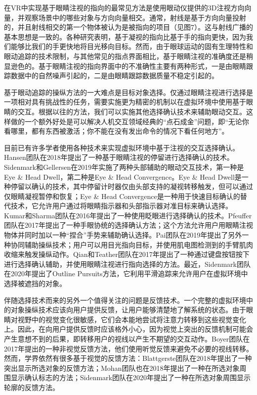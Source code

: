 在VR中实现基于眼睛注视的指向的最常见方法是使用眼动仪提供的3D注视方向向量，并观察场景中的哪些对象与方向向量相交。通常，射线是基于方向向量投射的，并且射线相交的第一个物体被认为是被指向的项目（见图7）。这与射线广播的基本思想是一致的。各种研究表明，基于凝视的指向比基于手的指向更快，因为我们能够比我们的手更快地将目光移向目标。然而，由于眼球运动的固有生理特性和眼动追踪的技术限制，与其他常见的指点界面相比，基于眼睛注视的准确度还是稍显逊色的。基于眼睛注视的指向界面中的不准确性主要有两种形式，一是由眼睛跟踪数据中的自然噪声引起的，二是由眼睛跟踪数据质量不稳定引起的。

基于眼动追踪的操纵方法的一大难点是目标对象选择。仅通过眼睛注视进行选择是一项相对具有挑战性的任务，需要实施更为精密的机制以在虚拟环境中使用基于眼睛的交互。根据以往的方法，我们可以实施其他选择确认技术来辅助眼动交互。这样做的一个额外好处是可以解决人机交互领域经典的“点石成金”问题，即“无论你看哪里，都有东西被激活；你不能在没有发出命令的情况下看任何地方”。

目前已有许多学者使用各种技术来实现虚拟环境中基于注视的交互选择确认。Hansen团队在2018年提出了一种基于眼睛注视的停留进行选择确认的技术。Sidenmark和Gellersen在2019年实施了两种头部辅助的眼动交互技术，第一种是Eye \& Head Dwell，第二种是Eye \& Head Convergence。Eye \& Head Dwell是一种停留以确认的技术，其中停留计时器仅由头部支持的凝视转移触发，但可以通过仅眼睛凝视暂停和恢复；Eye \& Head Convergence是一种用于快速目标确认的替代技术，它允许用户通过将眼睛指示器和头部指示器对准目标来确认选择。Kumar和Sharma团队在2016年提出了一种使用眨眼进行选择确认的技术。Pfeuffer团队在2017年提出了一种手眼协统的选择确认方法；这个方法允许用户用眼睛注视物体并同时加以一种“捏合”手势来辅助确认选择。Pai团队在2019年提出了另外一种协同辅助操纵技术；用户可以用目光指向目标，并使用肌电图检测到的手臂肌肉收缩来触发操纵动作。Qian和Teather团队在2017年提出了一种通过键盘按钮按下进行选择确认辅助，并使用眼睛注视进行指向选择的方法。最近，Sidenmark团队在2020年提出了Outline Pursuits方法，它利用平滑追踪来允许用户在虚拟环境中选择被遮挡的对象。

伴随选择技术而来的另外一个值得关注的问题是反馈技术。一个完整的虚拟环境中的对象操纵技术应该向用户提供反馈，让用户能够清楚地了解系统的状态。由于眼睛对视野中的视觉变化很敏感，它们会本能地尝试将注意力转移到这些视觉变化上。因此，在向用户提供反馈时应该格外小心，因为视觉上突出的反馈机制可能会产生意想不到的后果，即转移用户的视线以产生不期望的交互动作。Boyer团队在2017年提出的一种非视觉反馈方法，他们使用听觉反馈来避免不必要的视线转移。然而，学界依然有很多基于视觉的反馈方法：Blattgerste团队在2018年提出了一种突出显示所选对象的反馈方法；Mohan团队也在2018年提出了一种在所选对象周围显示确认标志的方法；Sidenmark团队在2020年提出了一种在所选对象周围显示轮廓的反馈方法。

